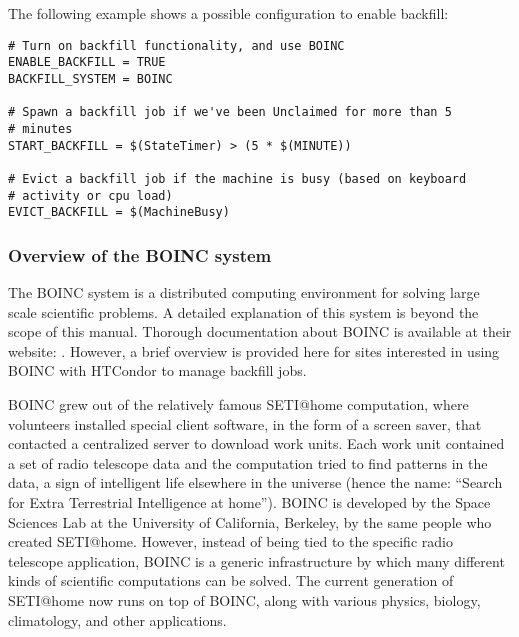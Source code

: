 The following example shows a possible configuration to enable
backfill:

\footnotesize
\begin{verbatim}
# Turn on backfill functionality, and use BOINC
ENABLE_BACKFILL = TRUE
BACKFILL_SYSTEM = BOINC

# Spawn a backfill job if we've been Unclaimed for more than 5
# minutes 
START_BACKFILL = $(StateTimer) > (5 * $(MINUTE))

# Evict a backfill job if the machine is busy (based on keyboard
# activity or cpu load)
EVICT_BACKFILL = $(MachineBusy)
\end{verbatim}
\normalsize


\subsubsection{\label{sec:Backfill-BOINC-overview}Overview of the
 BOINC system}


The BOINC system is a distributed computing environment for solving
large scale scientific problems.
A detailed explanation of this system is beyond the scope of this
manual.
Thorough documentation about BOINC is available at their website:
.
However, a brief overview is provided here for sites interested in
using BOINC with HTCondor to manage backfill jobs. 

BOINC grew out of the relatively famous SETI@home computation, where
volunteers installed special client software, in the form of a
screen saver, that contacted a centralized server to download work
units.
Each work unit contained a set of radio telescope data and the
computation tried to find patterns in the data, a sign of intelligent
life elsewhere in the universe (hence the name: ``Search for Extra
Terrestrial Intelligence at home'').
BOINC is developed by the Space Sciences Lab at the University of
California, Berkeley, by the same people who created SETI@home.
However, instead of being tied to the specific radio telescope
application, BOINC is a generic infrastructure by which many different
kinds of scientific computations can be solved.
The current generation of SETI@home now runs on top of BOINC, along
with various physics, biology, climatology, and other applications.

